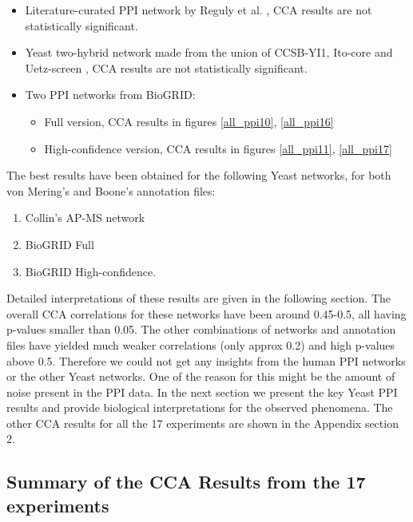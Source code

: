 \begin{itemize}
\begin{itemize}
    \item Literature-curated PPI network by Reguly et al. \cite{reguly2006comprehensive}, CCA results are not statistically significant.
    \item Yeast two-hybrid network made from the union of CCSB-YI1, Ito-core and Uetz-screen  \cite{yu2008high}, CCA results are not statistically significant.
    \item Two PPI networks from BioGRID:
    \begin{itemize}
      \item Full version, CCA results in figures  \ref{all_ppi10}, \ref{all_ppi16}
      \item High-confidence version, CCA results in figures   \ref{all_ppi11}, \ref{all_ppi17}
    \end{itemize}
  \end{itemize}
\end{itemize}

The best results have been obtained for the following Yeast networks, for both von Mering's and Boone's annotation files:
  \begin{enumerate}
    \item Collin's AP-MS network
    \item BioGRID Full
    \item BioGRID High-confidence.
  \end{enumerate}

Detailed interpretations of these results are given in the following section. The overall CCA correlations for these networks have been around 0.45-0.5, all having p-values smaller than 0.05. The other combinations of networks and annotation files have yielded much weaker correlations (only approx 0.2) and high p-values above 0.5. Therefore we could not get any insights from the human PPI networks or the other Yeast networks. One of the reason for this might be the amount of noise present in the PPI data. In the next section we present the key Yeast PPI results and provide biological interpretations for the observed phenomena. The other CCA results for all the 17 experiments are shown in the Appendix section 2.

\subsection{Summary of the CCA Results from the 17 experiments}
\label{sec:18_ppi_cca_results}

